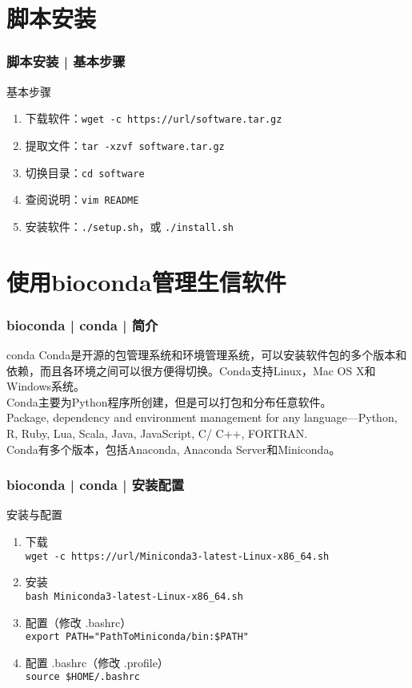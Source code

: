 \section{脚本安装}
\begin{frame}[fragile]
  \frametitle{脚本安装 | \alert{基本步骤}}
  \begin{block}{基本步骤}
    \begin{enumerate}
      \item 下载软件：\verb|wget -c https://url/software.tar.gz|
      \item 提取文件：\verb|tar -xzvf software.tar.gz|
      \item 切换目录：\verb|cd software|
      \item 查阅说明：\verb|vim README|
      \item 安装软件：\verb|./setup.sh|，或 \verb|./install.sh|
    \end{enumerate}
  \end{block}
\end{frame}

\section{使用bioconda管理生信软件}
\begin{frame}
  \frametitle{bioconda | conda | 简介}
  \begin{block}{conda}
    Conda是开源的包管理系统和环境管理系统，可以安装软件包的多个版本和依赖，而且各环境之间可以很方便得切换。Conda支持Linux，Mac OS X和Windows系统。\\
    \vspace{0.5em}
    Conda主要为Python程序所创建，但是可以打包和分布任意软件。\\
    Package, dependency and environment management for any language—Python, R, Ruby, Lua, Scala, Java, JavaScript, C/ C++, FORTRAN.\\
    \vspace{0.5em}
    Conda有多个版本，包括Anaconda, Anaconda Server和Miniconda。
  \end{block}
\end{frame}

\begin{frame}[fragile]
  \frametitle{bioconda | conda | 安装配置}
  \begin{block}{安装与配置}
    \begin{enumerate}
      \item 下载\\ \verb|wget -c https://url/Miniconda3-latest-Linux-x86_64.sh|
      \item 安装\\ \verb|bash Miniconda3-latest-Linux-x86_64.sh|
      \item 配置（修改 .bashrc）\\ \verb|export PATH="PathToMiniconda/bin:$PATH"|
      \item 配置 .bashrc（修改 .profile）\\ \verb|source $HOME/.bashrc|
    \end{enumerate}
  \end{block}
\end{frame}

